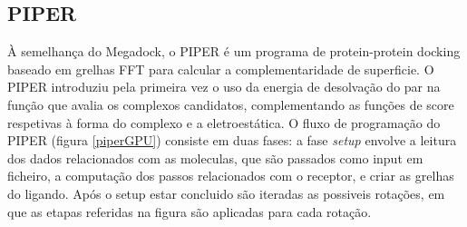  \subsection{PIPER}
 À semelhança do Megadock, o PIPER é um programa de protein-protein docking baseado em grelhas FFT para calcular a complementaridade de superficie. O PIPER introduziu pela primeira vez o uso da energia de desolvação do par na função que avalia os complexos candidatos, complementando as funções de score respetivas à forma do complexo e a eletroestática. O fluxo de programação do PIPER (figura \ref{piperGPU}) consiste em duas fases: a fase \textit{setup} envolve a leitura dos dados relacionados com as moleculas, que são passados como input em ficheiro, a computação dos passos relacionados com o receptor, e criar as grelhas do ligando. Após o setup estar concluido são iteradas as possiveis rotações, em que as etapas referidas na figura são aplicadas para cada rotação. 

